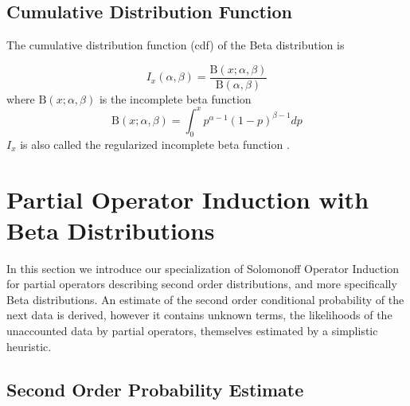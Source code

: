 \documentclass[runningheads]{llncs}
\begin{document}
\subsection{Cumulative Distribution Function}
The cumulative distribution function (cdf) of the Beta distribution is

\begin{equation}
I_x(\alpha, \beta) = \frac{\mathrm{B}(x; \alpha,
  \beta)}{\mathrm{B}(\alpha, \beta)}
\end{equation}
where $\mathrm{B}(x; \alpha, \beta)$ is the incomplete beta function
\begin{equation}
\mathrm{B}(x; \alpha, \beta) = \int_0^x p^{\alpha - 1}(1-p)^{\beta -
  1} dp
\end{equation}
$I_x$ is also called the regularized incomplete beta function
\cite{Weisstein18Regularized}.

\section{Partial Operator Induction with Beta Distributions }
\label{part-op}

In this section we introduce our specialization of Solomonoff Operator
Induction for partial operators describing second order distributions,
and more specifically Beta distributions. An estimate of the second
order conditional probability of the next data is derived, however it
contains unknown terms, the likelihoods of the unaccounted data by
partial operators, themselves estimated by a simplistic heuristic.

\subsection{Second Order Probability Estimate}
\end{document}
